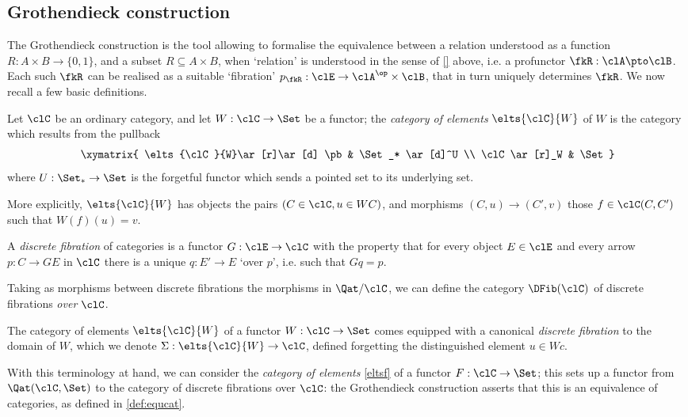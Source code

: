 \documentclass[a4paper]{../birkjour}
\begin{document}
\subsection{Grothendieck construction}
The Grothendieck construction is the tool allowing to formalise the equivalence between a relation understood as a function $R : A\times B \to \{0,1\}$, and a subset $R\subseteq A\times B$, when `relation' is understood in the sense of \autoref{} above, i.e. a profunctor $\fkR : \clA \pto \clB$. Each such $\fkR$ can be realised as a suitable `fibration' $p_\fkR : \clE \to \clA^\op\times\clB$, that in turn uniquely determines $\fkR$.
We now recall a few basic definitions.
\begin{definition}\label{eltsf}
	Let $\clC$ be an ordinary category, and let $W : \clC\to \Set$ be a functor; the \emph{category of elements} $\elts{\clC}{W}$ of $W$ is the category which results from the pullback
  \[
    \xymatrix{
      \elts{\clC}{W}\ar[r]\ar[d] \pb & \Set_* \ar[d]^U \\
      \clC \ar[r]_W & \Set
    }
  \]
  where $U : \Set_*\to\Set$ is the forgetful functor which sends a pointed set to its underlying set.
  
  More explicitly, $\elts{\clC}{W}$ has objects the pairs $(C\in\clC, u\in WC)$, and morphisms $(C,u)\to (C',v)$ those $f\in \clC(C,C')$ such that $W(f)(u)=v$.
\end{definition}
\begin{definition}
	\label{def:dfib}
	A \emph{discrete fibration} of categories is a functor $G : \clE \to \clC$ with the property that for every object $E\in\clE$ and every arrow $p : C\to GE$ in $\clC$ there is a unique $q : E'\to E$ `over $p$', i.e. such that $Gq=p$.
\end{definition}
Taking as morphisms between discrete fibrations the morphisms in $\Qat/\clC$, we can define the category $\DFib(\clC)$ of discrete fibrations \emph{over} $\clC$.
\begin{proposition}\label{fibelem}
	The category of elements $\elts{\clC}{W}$ of a functor $W : \clC\to \Set$ comes equipped with a canonical \emph{discrete fibration} to the domain of $W$, which we denote $\Sigma : \elts{\clC}{W}\to \clC$, defined forgetting the distinguished element $u\in Wc$.
\end{proposition}
With this terminology at hand, we can consider the \emph{category of elements} \ref{eltsf} of a functor $F : \clC\to \Set$; this sets up a functor from $\Qat(\clC,\Set)$ to the category of discrete fibrations over $\clC$: the Grothendieck construction asserts that this is an equivalence of categories, as defined in \ref{def:equcat}.
\end{document}
